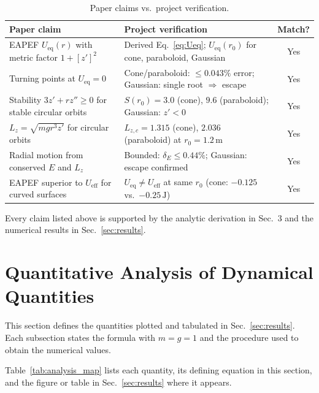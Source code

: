 \documentclass[11pt,letterpaper]{article}
\begin{document}
\begin{table}[htbp]
    \centering
    \caption{Paper claims vs.\ project verification.}
    \label{tab:paper_compare}
    \small
    \begin{tabular}{p{4.2cm}p{4.5cm}c}
        \toprule
        Paper claim \cite{ajp2026} & Project verification & Match? \\
        \midrule
        EAPEF $U_{\mathrm{eq}}(r)$ with metric factor $1+[z']^2$ & Derived Eq.~\eqref{eq:Ueq}; $U_{\mathrm{eq}}(r_0)$ for cone, paraboloid, Gaussian & Yes \\
        Turning points at $U_{\mathrm{eq}}=0$ & Cone/paraboloid: $\le 0.043\%$ error; Gaussian: single root $\Rightarrow$ escape & Yes \\
        Stability $3z'+rz''\ge 0$ for stable circular orbits & $S(r_0)=3.0$ (cone), $9.6$ (paraboloid); Gaussian: $z'<0$ & Yes \\
        $L_z=\sqrt{mgr^3 z'}$ for circular orbits & $L_{z,c}=1.315$ (cone), $2.036$ (paraboloid) at $r_0=1.2\,\mathrm{m}$ & Yes \\
        Radial motion from conserved $E$ and $L_z$ & Bounded: $\delta_E\le 0.44\%$; Gaussian: escape confirmed & Yes \\
        EAPEF superior to $U_{\mathrm{eff}}$ for curved surfaces & $U_{\mathrm{eq}}\ne U_{\mathrm{eff}}$ at same $r_0$ (cone: $-0.125$ vs.\ $-0.25\,\mathrm{J}$) & Yes \\
        \bottomrule
    \end{tabular}
\end{table}

Every claim listed above is supported by the analytic derivation in Sec.~3 and the numerical results in Sec.~\ref{sec:results}.

\section{Quantitative Analysis of Dynamical Quantities}
\label{sec:analysis}

This section defines the quantities plotted and tabulated in Sec.~\ref{sec:results}. Each subsection states the formula with $m=g=1$ and the procedure used to obtain the numerical values.

Table~\ref{tab:analysis_map} lists each quantity, its defining equation in this section, and the figure or table in Sec.~\ref{sec:results} where it appears.
\end{document}
